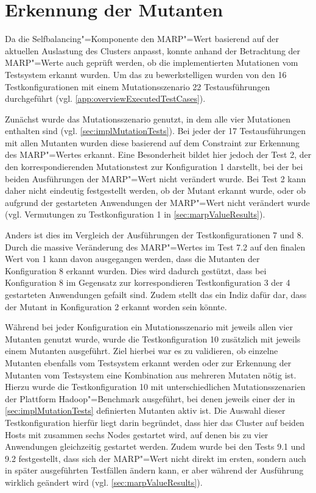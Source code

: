 \section{Erkennung der Mutanten}
\label{sec:killingMutants}

Da die Selfbalancing"=Komponente den \ac{MARP}"=Wert basierend auf der aktuellen Auslastung des Clusters anpasst, konnte anhand der Betrachtung der \ac{MARP}"=Werte auch geprüft werden, ob die implementierten Mutationen vom Testsystem erkannt wurden.
Um das zu bewerkstelligen wurden von den 16 Testkonfigurationen mit einem Mutationsszenario 22 Testausführungen durchgeführt (vgl. \cref{app:overviewExecutedTestCases}).

Zunächst wurde das Mutationsszenario genutzt, in dem alle vier Mutationen enthalten sind (vgl. \cref{sec:implMutationTests}).
Bei jeder der 17 Testausführungen mit allen Mutanten wurden diese basierend auf dem Constraint zur Erkennung des \ac{MARP}"=Wertes erkannt.
Eine Besonderheit bildet hier jedoch der Test 2, der den korrespondierenden Mutationstest zur Konfiguration 1 darstellt, bei der bei beiden Ausführungen der \ac{MARP}"=Wert nicht verändert wurde.
Bei Test 2 kann daher nicht eindeutig festgestellt werden, ob der Mutant erkannt wurde, oder ob aufgrund der gestarteten Anwendungen der \ac{MARP}"=Wert nicht verändert wurde (vgl. Vermutungen zu Testkonfiguration 1 in \cref{sec:marpValueResults}).

Anders ist dies im Vergleich der Ausführungen der Testkonfigurationen 7 und 8.
Durch die massive Veränderung des \ac{MARP}"=Wertes im Test 7.2 auf den finalen Wert von 1 kann davon ausgegangen werden, dass die Mutanten der Konfiguration 8 erkannt wurden.
Dies wird dadurch gestützt, dass bei Konfiguration 8 im Gegensatz zur korrespondieren Testkonfiguration 3 der 4 gestarteten Anwendungen gefailt sind.
Zudem stellt das ein Indiz dafür dar, dass der Mutant in Konfiguration 2 erkannt worden sein könnte.

Während bei jeder Konfiguration ein Mutationsszenario mit jeweils allen vier Mutanten genutzt wurde, wurde die Testkonfiguration 10 zusätzlich mit jeweils einem Mutanten ausgeführt.
Ziel hierbei war es zu validieren, ob einzelne Mutanten ebenfalls vom Testsystem erkannt werden oder zur Erkennung der Mutanten vom Testsystem eine Kombination aus mehreren Mutaten nötig ist.
Hierzu wurde die Testkonfiguration 10 mit unterschiedlichen Mutationsszenarien der Plattform Hadoop"=Benchmark ausgeführt, bei denen jeweils einer der in \cref{sec:implMutationTests} definierten Mutanten aktiv ist.
Die Auswahl dieser Testkonfiguration hierfür liegt darin begründet, dass hier das Cluster auf beiden Hosts mit zusammen sechs Nodes gestartet wird, auf denen bis zu vier Anwendungen gleichzeitig gestartet werden.
Zudem wurde bei den Tests 9.1 und 9.2 festgestellt, dass sich der \ac{MARP}"=Wert nicht direkt im ersten, sondern auch in später ausgeführten Testfällen ändern kann, er aber während der Ausführung wirklich geändert wird (vgl. \cref{sec:marpValueResults}).

